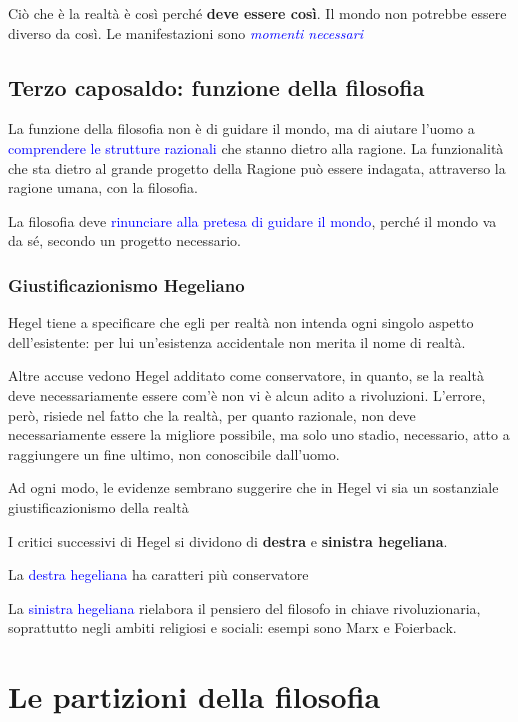 \documentclass[a4paper, twoside, titlepage]{book}
\renewcommand{\emph}[1]{\textcolor{blue}{#1}}
\begin{document}
Ciò che è la realtà è così perché \textbf{deve essere così}. Il mondo non potrebbe essere diverso da così. Le manifestazioni sono \emph{\textit{momenti necessari}}

\section{Terzo caposaldo: funzione della filosofia}

La funzione della filosofia non è di guidare il mondo, ma di aiutare l'uomo a \emph{comprendere le strutture razionali} che stanno dietro alla ragione. La funzionalità che sta dietro al grande progetto della Ragione può essere indagata, attraverso la ragione umana, con la filosofia.

La filosofia deve \emph{rinunciare alla pretesa di guidare il mondo}, perché il mondo va da sé, secondo un progetto necessario.

\subsection{Giustificazionismo Hegeliano}

Hegel tiene a specificare che egli per realtà non intenda ogni singolo aspetto dell'esistente: per lui un'esistenza accidentale non merita il nome di realtà.

Altre accuse vedono Hegel additato come conservatore, in quanto, se la realtà deve necessariamente essere com'è non vi è alcun adito a rivoluzioni.
L'errore, però, risiede nel fatto che la realtà, per quanto razionale, non deve necessariamente essere la migliore possibile, ma solo uno stadio, necessario, atto a raggiungere un fine ultimo, non conoscibile dall'uomo.

Ad ogni modo, le evidenze sembrano suggerire che in Hegel vi sia un sostanziale giustificazionismo della realtà

I critici successivi di Hegel si dividono di \textbf{destra} e \textbf{sinistra hegeliana}.

La \emph{destra hegeliana} ha caratteri più conservatore

La \emph{sinistra hegeliana} rielabora il pensiero del filosofo in chiave rivoluzionaria, soprattutto negli ambiti religiosi e sociali: esempi sono Marx e Foierback.

\chapter{Le partizioni della filosofia}
\end{document}
